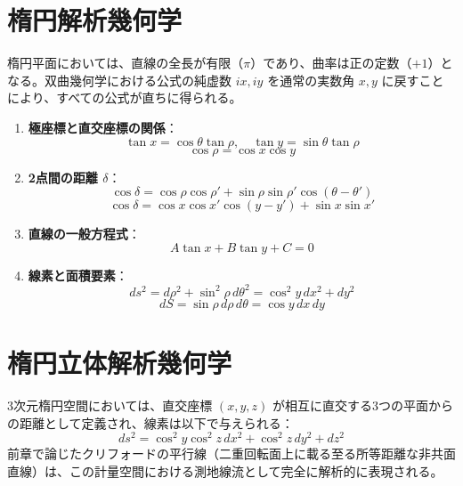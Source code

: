 \section{楕円解析幾何学}

楕円平面においては、直線の全長が有限（$\pi$）であり、曲率は正の定数（$+1$）となる。双曲幾何学における公式の純虚数 $ix, iy$ を通常の実数角 $x, y$ に戻すことにより、すべての公式が直ちに得られる。

\begin{enumerate}[label=\textbf{\arabic*.}]
\item \textbf{極座標と直交座標の関係}：
\[
\tan x = \cos\theta \tan \rho, \quad \tan y = \sin\theta \tan \rho
\]
\[
\cos \rho = \cos x \cos y
\]

\item \textbf{2点間の距離 $\delta$}：
\[
\cos \delta = \cos \rho \cos \rho' + \sin \rho \sin \rho' \cos(\theta - \theta')
\]
\[
\cos \delta = \cos x \cos x' \cos(y - y') + \sin x \sin x'
\]

\item \textbf{直線の一般方程式}：
\[
A \tan x + B \tan y + C = 0
\]

\item \textbf{線素と面積要素}：
\[
ds^2 = d\rho^2 + \sin^2 \rho\, d\theta^2 = \cos^2 y\, dx^2 + dy^2
\]
\[
dS = \sin \rho\, d\rho\, d\theta = \cos y\, dx\, dy
\]
\end{enumerate}

\section{楕円立体解析幾何学}

3次元楕円空間においては、直交座標 $(x, y, z)$ が相互に直交する3つの平面からの距離として定義され、線素は以下で与えられる：
\[
ds^2 = \cos^2 y \cos^2 z\, dx^2 + \cos^2 z\, dy^2 + dz^2
\]
前章で論じたクリフォードの平行線（二重回転面上に載る至る所等距離な非共面直線）は、この計量空間における測地線流として完全に解析的に表現される。
